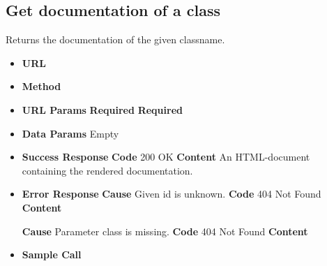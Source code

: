 \subsection{Get documentation of a class}
Returns the documentation of the given classname.
\begin{itemize}
\item \textbf{URL} 
\item \textbf{Method} 

\item \textbf{URL Params}
  \newline\textbf{Required} 
  \newline\textbf{Required} 

\item \textbf{Data Params} Empty
\item \textbf{Success Response}
  \newline\textbf{Code} 200 OK
  \newline\textbf{Content} An HTML-document containing the rendered documentation.

\item \textbf{Error Response}
  \newline\textbf{Cause} Given id is unknown.
  \newline\textbf{Code} 404 Not Found
  \newline\textbf{Content} 

  \fixedspace\textbf{Cause} Parameter class is missing.
  \newline\textbf{Code} 404 Not Found
  \newline\textbf{Content} 

\item \textbf{Sample Call}
\end{itemize}
